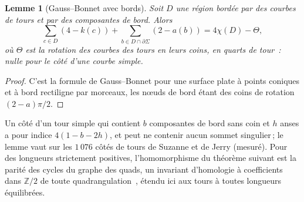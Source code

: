 \documentclass[11pt,a4paper]{article}
\newtheorem{lemma}{Lemme}
\newcommand{\Z}{\mathbb{Z}}
\newenvironment{evidence}[3][]{}{}
\begin{document}
\begin{evidence}{tested}{à $\Theta = 0$ et sans bord, 3\,833 régions de 50 instances aléatoires\,; le terme de bord n'est pas testé}
\begin{lemma}[Gauss--Bonnet avec bords]\label{lem:gauss-border}
Soit $D$ une région bordée par des courbes de tours et par des composantes de
bord. Alors
\[
  \sum_{c \in D} (4 - k(c)) + \sum_{b \in D \cap \partial\Sigma} (2 - a(b))
  = 4\chi(D) - \Theta,
\]
où $\Theta$ est la rotation des courbes des tours en leurs coins, en quarts de
tour~: nulle pour le côté d'une courbe simple.
\end{lemma}
\end{evidence}
\begin{proof}
C'est la formule de Gauss--Bonnet pour une surface plate à points coniques et
à bord rectiligne par morceaux, les nœuds de bord étant des coins de rotation
$(2 - a)\pi/2$.
\end{proof}

Un côté d'un tour simple qui contient $b$ composantes de bord sans coin et $h$
anses a pour indice $4(1 - b - 2h)$, et peut ne contenir aucun sommet
singulier\,; le lemme vaut sur les $1\,076$ côtés de tours de Suzanne et de
Jerry (mesuré). Pour des longueurs strictement positives, l'homomorphisme du
théorème suivant est la parité des cycles du graphe des quads, un invariant
d'homologie à coefficients dans $\Z/2$ de toute
quadrangulation~\cite[lemme~3.1]{kaiser2015colouring}, étendu ici aux tours à
toutes longueurs équilibrées.
\end{document}

